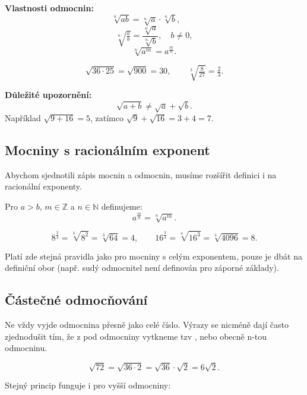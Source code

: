 \documentclass[12pt,a4paper]{article}
\begin{document}
\textbf{Vlastnosti odmocnin:}
\[
\sqrt[n]{ab} = \sqrt[n]{a} \cdot \sqrt[n]{b}, \qquad
\]
\[
\sqrt[n]{\tfrac{a}{b}} = \frac{\sqrt[n]{a}}{\sqrt[n]{b}}, \quad b \neq 0,
\]
\[
\sqrt[n]{a^m} = a^{\tfrac{m}{n}}.
\]

\begin{examplebox}
\[
\sqrt{36 \cdot 25} = \sqrt{900} = 30, \qquad
\sqrt[3]{\tfrac{8}{27}} = \tfrac{2}{3}.
\]
\end{examplebox}

\textbf{Důležité upozornění:}
\[
\sqrt{a+b} \neq \sqrt{a} + \sqrt{b}.
\]
Například $\sqrt{9+16} = 5$, zatímco $\sqrt{9} + \sqrt{16} = 3+4=7$.

\subsection{Mocniny s racionálním exponent}

Abychom sjednotili zápis mocnin a odmocnin, musíme rozšířit definici i na racionální exponenty.

\begin{definitionbox}
    Pro $a>b$, $m \in \mathbb{Z}$ a $n \in \mathbb{N}$ definujeme:
    \[
    a^{\tfrac{m}{n}} = \sqrt[n]{a^m}.
    \]
\end{definitionbox}

\begin{examplebox}
    \[
    8^{\tfrac{2}{3}} = \sqrt[3]{8^2} = \sqrt[3]{64} = 4, \qquad
    16^{\tfrac{3}{4}} = \sqrt[4]{16^3} = \sqrt[4]{4096} = 8.
    \]
\end{examplebox}

Platí zde stejná pravidla jako pro mocniny s celým exponentem, pouze je dbát 
na definiční obor (např. sudý odmocnitel není definován pro záporné základy).

\subsection{Částečné odmocňování}

Ne vždy vyjde odmocnina přesně jako celé číslo.
Výrazy se nicméně dají často zjednodušit tím, že z pod odmocniny vytkneme tzv ,
nebo obecně n-tou odmocninu.

\begin{examplebox}
    \[
    \sqrt{72} = \sqrt{36 \cdot 2} = \sqrt{36} \cdot \sqrt{2} = 6\sqrt{2}.
    \]
\end{examplebox}

Stejný princip funguje i pro vyšší odmocniny:
\end{document}
